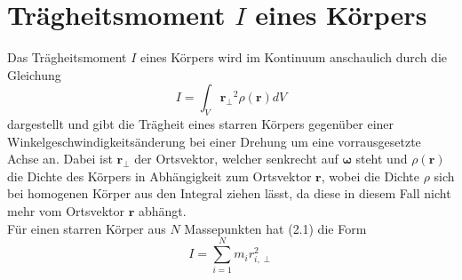 

\section{Trägheitsmoment $I$ eines Körpers}

Das Trägheitsmoment $I$ eines Körpers wird im Kontinuum anschaulich durch die Gleichung
\begin{equation}
    I = \int_V \mathbf{r_\perp}^2 \rho(\mathbf{r}) dV
\end{equation}
dargestellt und gibt die Trägheit eines starren Körpers gegenüber
einer Winkelgeschwindigkeitsänderung bei einer Drehung um eine vorrausgesetzte Achse an. 
Dabei ist $\mathbf{r_\perp}$ der Ortsvektor, welcher senkrecht auf $\mathbf{\omega}$ steht und 
$\rho(\mathbf{r})$ die Dichte des Körpers in Abhängigkeit zum Ortsvektor $\mathbf{r}$, wobei die Dichte $\rho$ sich
bei homogenen Körper aus den Integral ziehen lässt, da diese in diesem Fall nicht mehr vom Ortsvektor $\mathbf{r}$ abhängt.\\
Für einen starren Körper aus $N$ Massepunkten hat (2.1) die Form
\begin{equation}
    I = \sum_{i=1}^{N} m_i r_{i,\perp}^2
\end{equation}
